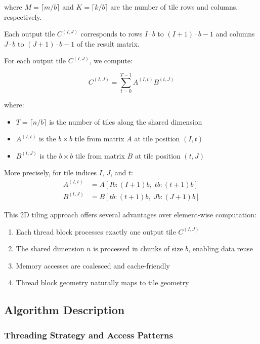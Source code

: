 \documentclass{amsbook}
\theoremstyle{definition}
\begin{document}
where $M = \lceil m/b \rceil$ and $K = \lceil k/b \rceil$ are the number of tile rows and columns, respectively.

Each output tile $C^{(I,J)}$ corresponds to rows $I \cdot b$ to $(I+1) \cdot b - 1$ and columns $J \cdot b$ to $(J+1) \cdot b - 1$ of the result matrix.

For each output tile $C^{(I,J)}$, we compute:

\begin{equation}
C^{(I,J)} = \sum_{t=0}^{T-1} A^{(I,t)} B^{(t,J)}
\end{equation}

where:
\begin{itemize}
\item $T = \lceil n/b \rceil$ is the number of tiles along the shared dimension
\item $A^{(I,t)}$ is the $b \times b$ tile from matrix $A$ at tile position $(I,t)$
\item $B^{(t,J)}$ is the $b \times b$ tile from matrix $B$ at tile position $(t,J)$
\end{itemize}

More precisely, for tile indices $I$, $J$, and $t$:
\begin{align}
A^{(I,t)} &= A[I b : (I+1) b, \; t b : (t+1) b] \\
B^{(t,J)} &= B[t b : (t+1) b, \; J b : (J+1) b]
\end{align}

This 2D tiling approach offers several advantages over element-wise computation:
\begin{enumerate}
\item Each thread block processes exactly one output tile $C^{(I,J)}$
\item The shared dimension $n$ is processed in chunks of size $b$, enabling data reuse
\item Memory accesses are coalesced and cache-friendly
\item Thread block geometry naturally maps to tile geometry
\end{enumerate}

\subsection{Algorithm Description}

\subsubsection{Threading Strategy and Access Patterns}
\end{document}
